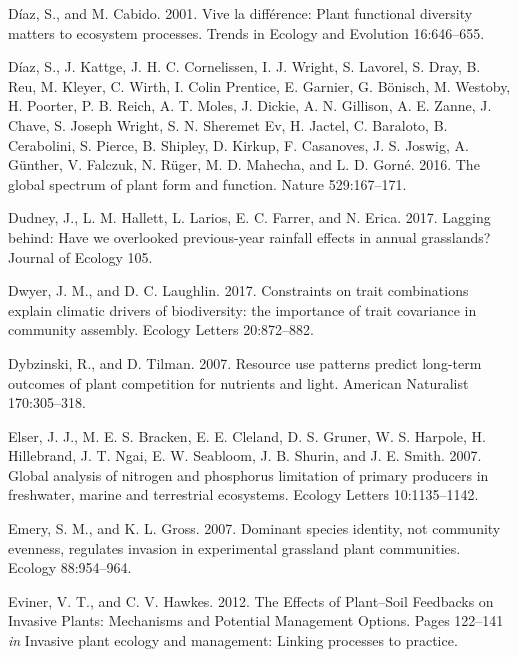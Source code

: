 \documentclass[twoside,12pt,final]{ucthesis-CA2012}
\begin{document}
\begin{ucmainmatter}
\leavevmode\hypertarget{ref-Diaz2001}{}%
Díaz, S., and M. Cabido. 2001. Vive la différence: Plant functional diversity matters to ecosystem processes. Trends in Ecology and Evolution 16:646--655.

\leavevmode\hypertarget{ref-Diaz2016}{}%
Díaz, S., J. Kattge, J. H. C. Cornelissen, I. J. Wright, S. Lavorel, S. Dray, B. Reu, M. Kleyer, C. Wirth, I. Colin Prentice, E. Garnier, G. Bönisch, M. Westoby, H. Poorter, P. B. Reich, A. T. Moles, J. Dickie, A. N. Gillison, A. E. Zanne, J. Chave, S. Joseph Wright, S. N. Sheremet Ev, H. Jactel, C. Baraloto, B. Cerabolini, S. Pierce, B. Shipley, D. Kirkup, F. Casanoves, J. S. Joswig, A. Günther, V. Falczuk, N. Rüger, M. D. Mahecha, and L. D. Gorné. 2016. The global spectrum of plant form and function. Nature 529:167--171.

\leavevmode\hypertarget{ref-Dudney2017}{}%
Dudney, J., L. M. Hallett, L. Larios, E. C. Farrer, and N. Erica. 2017. Lagging behind: Have we overlooked previous-year rainfall effects in annual grasslands? Journal of Ecology 105.

\leavevmode\hypertarget{ref-Dwyer2017}{}%
Dwyer, J. M., and D. C. Laughlin. 2017. Constraints on trait combinations explain climatic drivers of biodiversity: the importance of trait covariance in community assembly. Ecology Letters 20:872--882.

\leavevmode\hypertarget{ref-Dybzinski2007a}{}%
Dybzinski, R., and D. Tilman. 2007. Resource use patterns predict long-term outcomes of plant competition for nutrients and light. American Naturalist 170:305--318.

\leavevmode\hypertarget{ref-Elser2007}{}%
Elser, J. J., M. E. S. Bracken, E. E. Cleland, D. S. Gruner, W. S. Harpole, H. Hillebrand, J. T. Ngai, E. W. Seabloom, J. B. Shurin, and J. E. Smith. 2007. Global analysis of nitrogen and phosphorus limitation of primary producers in freshwater, marine and terrestrial ecosystems. Ecology Letters 10:1135--1142.

\leavevmode\hypertarget{ref-Emery2007}{}%
Emery, S. M., and K. L. Gross. 2007. Dominant species identity, not community evenness, regulates invasion in experimental grassland plant communities. Ecology 88:954--964.

\leavevmode\hypertarget{ref-Eviner2012}{}%
Eviner, V. T., and C. V. Hawkes. 2012. The Effects of Plant--Soil Feedbacks on Invasive Plants: Mechanisms and Potential Management Options. Pages 122--141 \emph{in} Invasive plant ecology and management: Linking processes to practice.


\end{ucmainmatter}
\end{document}
